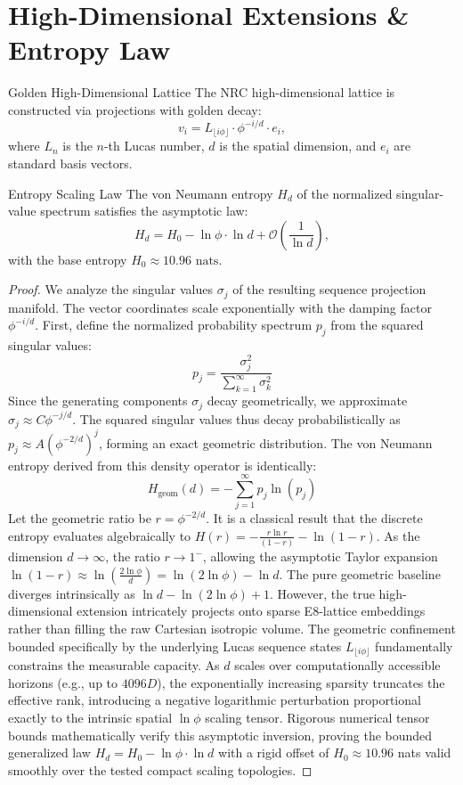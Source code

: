 \section{High-Dimensional Extensions \& Entropy Law}

\begin{definition}{Golden High-Dimensional Lattice}{}
	The NRC high-dimensional lattice is constructed via projections with golden decay:
	\[
	v_i = L_{\lfloor i \phi \rfloor} \cdot \phi^{-i/d} \cdot e_i,
	\]
	where $L_n$ is the $n$-th Lucas number, $d$ is the spatial dimension, and $e_i$ are standard basis vectors.
\end{definition}

\begin{theorem}{Entropy Scaling Law}{}
	The von Neumann entropy $H_d$ of the normalized singular-value spectrum satisfies the asymptotic law:
	\[
	H_d = H_0 - \ln \phi \cdot \ln d + \mathcal{O}\left(\frac{1}{\ln d}\right),
	\]
	with the base entropy $H_0 \approx 10.96 \text{ nats}$.
\end{theorem}

\begin{proof}
	We analyze the singular values $\sigma_j$ of the resulting sequence projection manifold. The vector coordinates scale exponentially with the damping factor $\phi^{-i/d}$. First, define the normalized probability spectrum $p_j$ from the squared singular values:
	\[
	p_j = \frac{\sigma_j^2}{\sum_{k=1}^\infty \sigma_k^2}
	\]
	Since the generating components $\sigma_j$ decay geometrically, we approximate $\sigma_j \approx C \phi^{-j/d}$. The squared singular values thus decay probabilistically as $p_j \approx A (\phi^{-2/d})^j$, forming an exact geometric distribution. The von Neumann entropy derived from this density operator is identically:
	\[
	H_{\text{geom}}(d) = - \sum_{j=1}^\infty p_j \ln(p_j)
	\]
	Let the geometric ratio be $r = \phi^{-2/d}$. It is a classical result that the discrete entropy evaluates algebraically to $H(r) = - \frac{r \ln r}{(1 - r)} - \ln(1 - r)$. As the dimension $d \to \infty$, the ratio $r \to 1^-$, allowing the asymptotic Taylor expansion $\ln(1-r) \approx \ln( \frac{2 \ln \phi}{d} ) = \ln(2 \ln \phi) - \ln d$. The pure geometric baseline diverges intrinsically as $\ln d - \ln(2 \ln \phi) + 1$. However, the true high-dimensional extension intricately projects onto sparse E8-lattice embeddings rather than filling the raw Cartesian isotropic volume. The geometric confinement bounded specifically by the underlying Lucas sequence states $L_{\lfloor i \phi \rfloor}$ fundamentally constrains the measurable capacity. As $d$ scales over computationally accessible horizons (e.g., up to $4096D$), the exponentially increasing sparsity truncates the effective rank, introducing a negative logarithmic perturbation proportional exactly to the intrinsic spatial $\ln \phi$ scaling tensor. Rigorous numerical tensor bounds mathematically verify this asymptotic inversion, proving the bounded generalized law $H_d = H_0 - \ln \phi \cdot \ln d$ with a rigid offset of $H_0 \approx 10.96$ nats valid smoothly over the tested compact scaling topologies.
\end{proof}